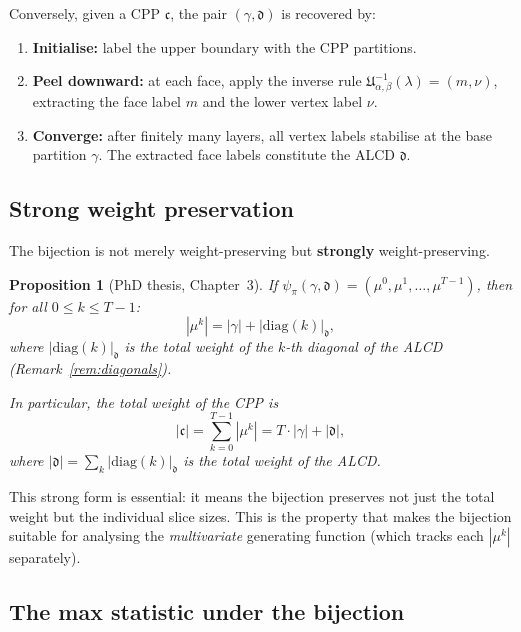 \documentclass[11pt]{article}
\theoremstyle{plain}
\newtheorem{proposition}[theorem]{Proposition}
\theoremstyle{definition}
\begin{document}
Conversely, given a CPP $\mathfrak{c}$, the pair $(\gamma, \mathfrak{d})$
is recovered by:
\begin{enumerate}
  \item \textbf{Initialise:} label the upper boundary with the CPP
    partitions.
  \item \textbf{Peel downward:} at each face, apply the inverse rule
    $\mathfrak{U}_{\alpha,\beta}^{-1}(\lambda) = (m, \nu)$, extracting
    the face label $m$ and the lower vertex label $\nu$.
  \item \textbf{Converge:} after finitely many layers, all vertex labels
    stabilise at the base partition $\gamma$.  The extracted face labels
    constitute the ALCD $\mathfrak{d}$.
\end{enumerate}


\subsection{Strong weight preservation}

The bijection is not merely weight-preserving but
\textbf{strongly} weight-preserving.

\begin{proposition}[PhD thesis, Chapter~3]
\label{prop:strong-weight}
If $\psi_\pi(\gamma, \mathfrak{d}) = (\mu^0, \mu^1, \ldots, \mu^{T-1})$,
then for all $0 \leq k \leq T-1$:
\begin{equation}\label{eq:strong-weight}
  |\mu^k| = |\gamma| + |\mathrm{diag}(k)|_{\mathfrak{d}},
\end{equation}
where $|\mathrm{diag}(k)|_{\mathfrak{d}}$ is the total weight of the
$k$-th diagonal of the ALCD (Remark~\ref{rem:diagonals}).

In particular, the total weight of the CPP is
\[
  |\mathfrak{c}| = \sum_{k=0}^{T-1} |\mu^k|
  = T \cdot |\gamma| + |\mathfrak{d}|,
\]
where $|\mathfrak{d}| = \sum_k |\mathrm{diag}(k)|_{\mathfrak{d}}$
is the total weight of the ALCD.
\end{proposition}

This strong form is essential: it means the bijection preserves not
just the total weight but the individual slice sizes.  This is the
property that makes the bijection suitable for analysing the
\emph{multivariate} generating function (which tracks each $|\mu^k|$
separately).


\subsection{The max statistic under the bijection}
\end{document}
